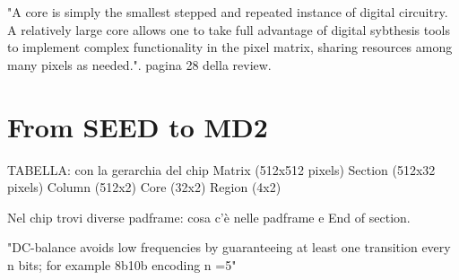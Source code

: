 "A core is simply the smallest stepped and repeated instance of digital circuitry.
A relatively large core allows one to take full advantage of digital sybthesis tools
to implement complex functionality in the pixel matrix, sharing resources among
many pixels as needed.".
pagina 28 della review.\\

\section{From SEED to MD2}


TABELLA: con la gerarchia del chip
Matrix (512x512 pixels)
Section (512x32 pixels)
Column (512x2)
Core (32x2)
Region (4x2)

Nel chip trovi diverse padframe: cosa c'è nelle padframe e End of section.

"DC-balance avoids low frequencies by guaranteeing at least one transition every
n bits; for example 8b10b encoding n =5"

